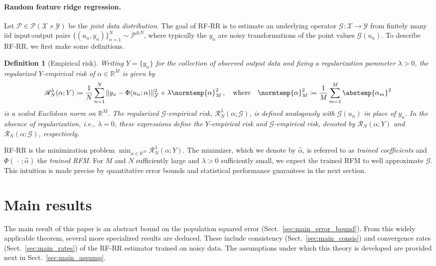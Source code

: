 \documentclass{article}
\theoremstyle{plain}
\theoremstyle{my_def}
\newtheorem{definition}[theorem]{Definition}
\theoremstyle{my_rem}
\numberwithin{equation}{section}
\numberwithin{theorem}{section}%
\newcommand{\R}{\mathbb{R}}
\newcommand{\scrR}{\mathscr{R}}
\newcommand{\scrP}{\mathscr{P}}
\newcommand{\cG}{\mathcal{G}}
\newcommand{\cP}{\mathcal{P}}
\newcommand{\cX}{\mathcal{X}}
\newcommand{\cY}{\mathcal{Y}}
\newcommand{\norm}{\normtemp}
\newcommand{\abs}{\abstemp}
\renewcommand{\hat}{\widehat}
\newcommand{\slot}{{\,\cdot\,}}
\newcommand{\defeq}{\coloneqq} %
\newcommand{\al}{\alpha}
\def\qw{\quad\text{where}\quad}
\newcommand{\alhat}{\hat{\al}}
\newcommand{\define}[1]{{\emph{#1}}}
\begin{document}
\paragraph{Random feature ridge regression.}
Let $\cP\in\scrP(\cX\times\cY)$ be the \emph{joint data distribution}. The goal of RF-RR is to estimate an underlying operator $\cG\colon \cX \to \cY$ from finitely many iid input-output pairs $\{(u_n,y_n)\}_{n=1}^N\sim\cP^{\otimes N}$, where typically the $y_n$ are noisy transformations of the point values $\cG(u_n)$. To describe RF-RR, we first make some definitions.

\begin{definition}[Empirical risk]\label{def:prelim_emp}
    Writing $Y=\{y_n\}$ for the collection of observed output data and fixing a regularization parameter $\lambda > 0$, the \define{regularized $Y$-empirical risk} of $\al\in\R^M$ is given by
    \begin{align}\label{eq:prelim_reg}
        \scrR_N^\lambda(\al;Y)\defeq \frac1N \sum_{n=1}^N \Vert y_n - \Phi(u_n;\al)\Vert_{\cY}^2 +\lambda \norm{\al}_M^2\,,\qw \norm{\alpha}^2_M\defeq \frac{1}{M}\sum_{m=1}^M\abs{\alpha_m}^2
    \end{align} 
    is a scaled Euclidean norm  on $\R^M$. The \define{regularized $\cG$-empirical risk}, $\scrR_N^\lambda(\al;\cG)$, is defined analogously with $\cG(u_n)$ in place of $y_n$. In the absence of regularization, i.e., $\lambda = 0$, these expressions define the \define{$Y$-empirical risk} and \define{$\cG$-empirical risk}, denoted by $\scrR_N(\al;Y)$ and $\scrR_N(\al;\cG)$, respectively.
\end{definition}

RF-RR is the minimization problem $\min_{\al\in\R^M} \scrR_N^\lambda(\al;Y)$. The minimizer, which we denote by $\alhat$, is referred to as \emph{trained coefficients} and $\Phi(\slot;\alhat)$ the \emph{trained RFM}. For $M$ and $N$ sufficiently large and $\lambda>0$ sufficiently small, we expect the trained RFM to well approximate $\cG$. This intuition is made precise by quantitative error bounds and statistical performance guarantees in the next section.



\section{Main results}\label{sec:main}
The main result of this paper is an abstract bound on the population squared error (Sect.~\ref{sec:main_error_bound}). From this widely applicable theorem, several more specialized results are deduced. These include consistency (Sect.~\ref{sec:main_consis}) and convergence rates (Sect.~\ref{sec:main_rates}) of the RF-RR estimator trained on noisy data. The assumptions under which this theory is developed are provided next in Sect.~\ref{sec:main_assump}.
\end{document}
